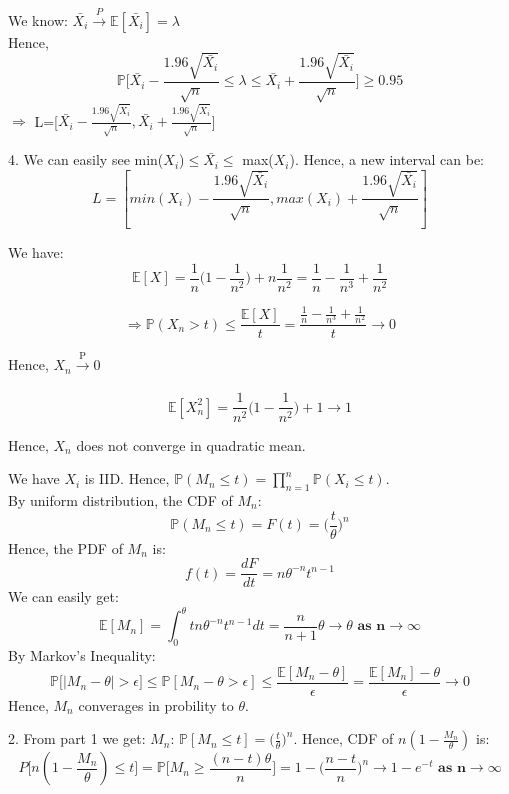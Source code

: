 \documentclass[10pt]{article}
\newenvironment{problem}[2][Problem]{\begin{trivlist}
\item[\hskip \labelsep {\bfseries #1}\hskip \labelsep {\bfseries #2.}]}{\end{trivlist}}
\begin{document}
\begin{problem}{3}
We know: $\bar{X_i} \xrightarrow{P} \mathbb{E}[\bar{X_i}]=\lambda$\\
Hence, 
\[ \mathbb{P}\Big[\bar{X_i}- \frac{1.96\sqrt{\bar{X_i}}}{\sqrt{n}} \leqslant \lambda \leqslant \bar{X_i}+ \frac{1.96\sqrt{\bar{X_i}}}{\sqrt{n}}  \Big] \geqslant 0.95\]
$\Rightarrow$ L=[$\bar{X_i}- \frac{1.96\sqrt{\bar{X_i}}}{\sqrt{n}}, \bar{X_i}+ \frac{1.96\sqrt{\bar{X_i}}}{\sqrt{n}}$] 
\item 4.
We can easily see min($X_i$)$\leqslant \bar{X_i} \leqslant$ max($X_i$). Hence, a new interval can be: 
\[L=[min(X_i)- \frac{1.96\sqrt{\bar{X_i}}}{\sqrt{n}}, max(X_i)+ \frac{1.96\sqrt{\bar{X_i}}}{\sqrt{n}}]\]
\end{problem}



\begin{problem}{4}

We have:
\[\mathbb{E}[X]=\frac{1}{n}\big(1-\frac{1}{n^2} \big)+ n\frac{1}{n^2}=\frac{1}{n}- \frac{1}{n^3}+ \frac{1}{n^2}\]

\[\Rightarrow \mathbb{P}(X_n > t) \leqslant \frac{\mathbb{E}[X]}{t}=\frac{\frac{1}{n}- \frac{1}{n^3}+ \frac{1}{n^2}}{t} \rightarrow 0 \]

Hence, $X_n \xrightarrow[]{\text{P}} 0 $

\[\mathbb{E}[X_n^2]=\frac{1}{n^2}\big(1-\frac{1}{n^2} \big) +1 \rightarrow 1 \]

Hence, $X_n$ does not converge in quadratic mean.




We have $X_i$ is IID. Hence, $\mathbb{P}(M_n \leqslant t)=\prod_{n=1}^{n}\mathbb{P}(X_i\leqslant t).$\\
By uniform distribution, the CDF of $M_n$:
\[ \mathbb{P}(M_n \leqslant t)=F(t)=\Big(\frac{t}{\theta}\Big)^n \]
Hence, the PDF of $M_n$ is:
\[f(t)=\frac{dF}{dt}=n\theta^{-n}t^{n-1} \]
We can easily get:
\[\mathbb{E}[M_n]= \int_{0}^{\theta} tn\theta^{-n}t^{n-1}dt=\frac{n}{n+1}\theta \rightarrow \theta \textbf{ as n}\rightarrow \infty \]
By Markov's Inequality:
\[ \mathbb{P}\Big[ | M_n -\theta|> \epsilon \Big]\leqslant \mathbb{P}[M_n-\theta>\epsilon] \leqslant \frac{\mathbb{E}[M_n-\theta]}{\epsilon}=\frac{\mathbb{E}[M_n]-\theta}{\epsilon} \rightarrow 0\]
Hence, $M_n$ converages in probility to $\theta$.

\item 2.
From part 1 we get: $M_n$: $\mathbb{P}[M_n \leqslant t]=\Big(\frac{t}{\theta}\Big)^n$. Hence, CDF of $n(1-\frac{M_n}{\theta})$ is:
\[ P\Big[n(1-\frac{M_n}{\theta})\leqslant t\Big]=\mathbb{P}\Big[M_n \geqslant \frac{(n-t)\theta}{n} \Big] =1-\Big(\frac{n-t}{n}\Big)^{n} \rightarrow 1- e^{-t} \textbf{ as n}  \rightarrow \infty\]


\end{problem}
\end{document}
